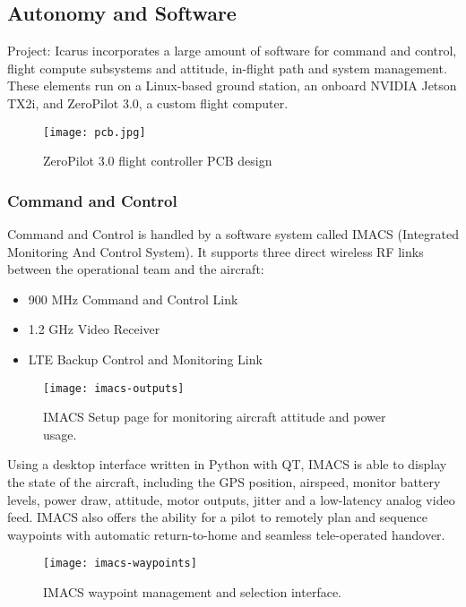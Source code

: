 \subsection{Autonomy and Software}
\label{sec:autonomy-and-software}

Project: Icarus incorporates a large amount of software for command and
control, flight compute subsystems and attitude, in-flight path and system
management. These elements run on a Linux-based ground station, an onboard
NVIDIA Jetson TX2i, and ZeroPilot 3.0, a custom flight computer.

\begin{figure}[H]
        \centering
        \texttt{[image: pcb.jpg]}
        \caption{ZeroPilot 3.0 flight controller PCB design}
\end{figure}

\subsubsection{Command and Control}
\label{sec:command-and-control}

Command and Control is handled by a software system called IMACS (Integrated
Monitoring And Control System). It supports three direct wireless RF links
between the operational team and the aircraft:

\begin{itemize}
    \item 900 MHz Command and Control Link
    \item 1.2 GHz Video Receiver
    \item LTE Backup Control and Monitoring Link
\end{itemize}

\begin{figure}[h]
        \centering
        \texttt{[image: imacs-outputs]}
        \caption{IMACS Setup page for monitoring aircraft attitude and power usage.}
\end{figure}

Using a desktop interface written in Python with QT, IMACS is able to display
the state of the aircraft, including the GPS position, airspeed, monitor
battery levels, power draw, attitude, motor outputs, jitter and a low-latency
analog video feed. IMACS also offers the ability for a pilot to remotely plan
and sequence waypoints with automatic return-to-home and seamless tele-operated
handover.

\begin{figure}[H]
        \centering
        \texttt{[image: imacs-waypoints]}
        \caption{IMACS waypoint management and selection interface.}
\end{figure}

